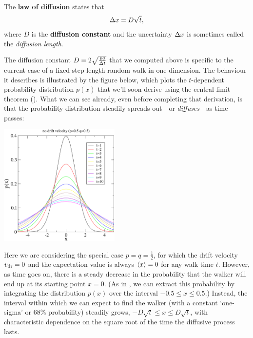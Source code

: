 \begin{shaded}
  The \textbf{law of diffusion} states that
  \begin{equation}
    \label{eq:diff_law}
    \Delta x = D \sqrt{t},
  \end{equation}
  where $D$ is the \textbf{diffusion constant} and the uncertainty $\Delta x$ is sometimes called the \textit{diffusion length}.
\end{shaded}

The diffusion constant $D = 2\sqrt{\frac{pq}{\Delta t}}$ that we computed above is specific to the current case of a fixed-step-length random walk in one dimension.
The behaviour it describes is illustrated by the figure below, which plots the $t$-dependent probability distribution $p(x)$ that we'll soon derive using the central limit theorem ().
What we can see already, even before completing that derivation, is that the probability distribution steadily spreads out---or \textit{diffuses}---as time passes:
\begin{center}
  \includegraphics[width=0.45\textwidth]{figs/unit01_diff_zero.pdf}
\end{center}
Here we are considering the special case $p = q = \frac{1}{2}$, for which the drift velocity $v_{\mathrm{dr}} = 0$ and the expectation value is always $\left\langle x \right\rangle = 0$ for any walk time $t$.
However, as time goes on, there is a steady decrease in the probability that the walker will end up at its starting point $x = 0$.
(As in , we can extract this probability by integrating the distribution $p(x)$ over the interval $-0.5 \leq x \leq 0.5$.)
Instead, the interval within which we can expect to find the walker (with a constant `one-sigma' or 68\% probability) steadily grows, $-D\sqrt{t} \leq x \leq D\sqrt{t}$, with characteristic dependence on the square root of the time the diffusive process lasts.

